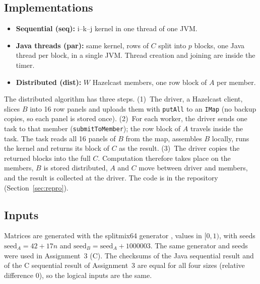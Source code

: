 \documentclass[11pt,a4paper]{article}
\begin{document}
\subsection{Implementations}
\begin{itemize}
  \item \textbf{Sequential (seq):} i--k--j kernel in one thread of one JVM.
  \item \textbf{Java threads (par):} same kernel, rows of $C$ split into $p$ blocks, one Java
        thread per block, in a single JVM. Thread creation and joining are inside the timer.
  \item \textbf{Distributed (dist):} $W$ Hazelcast members, one row block of $A$ per member.
\end{itemize}
The distributed algorithm has three steps. (1)~The driver, a Hazelcast client, slices $B$
into 16 row panels and uploads them with \texttt{putAll} to an \texttt{IMap} (no backup
copies, so each panel is stored once). (2)~For each worker, the driver sends one task to that
member (\texttt{submitToMember}); the row block of $A$ travels inside the task. The task reads
all 16 panels of $B$ from the map, assembles $B$ locally, runs the kernel and returns its block
of $C$ as the result. (3)~The driver copies the returned blocks into the full $C$. Computation
therefore takes place on the members, $B$ is stored distributed, $A$ and $C$ move between
driver and members, and the result is collected at the driver. The code is in the repository
(Section~\ref{sec:repro}).

\subsection{Inputs}
Matrices are generated with the splitmix64 generator \cite{splitmix}, values in $[0,1)$, with
seeds $\mathrm{seed}_A=42+17n$ and $\mathrm{seed}_B=\mathrm{seed}_A+1000003$. The same
generator and seeds were used in Assignment~3 (C). The checksums of the Java sequential result
and of the C sequential result of Assignment~3 are equal for all four sizes (relative
difference 0), so the logical inputs are the same.
\end{document}
